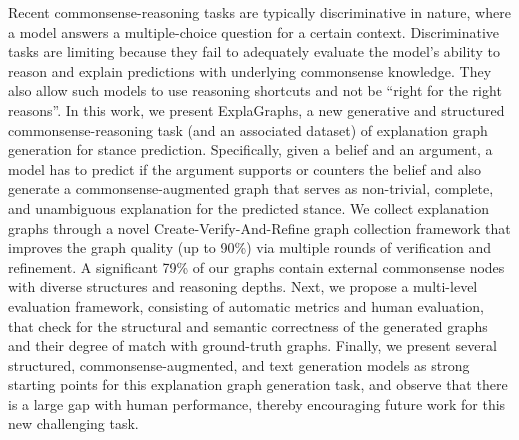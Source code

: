 Recent commonsense-reasoning tasks are typically discriminative in nature, where a model answers a multiple-choice question for a certain context. Discriminative tasks are limiting because they fail to adequately evaluate the model's ability to reason and explain predictions with underlying commonsense knowledge. They also allow such models to use reasoning shortcuts and not be ``right for the right reasons''. In this work, we present ExplaGraphs, a new generative and structured commonsense-reasoning task (and an associated dataset) of explanation graph generation for stance prediction. Specifically, given a belief and an argument, a model has to predict if the argument supports or counters the belief and also generate a commonsense-augmented graph that serves as non-trivial, complete, and unambiguous explanation for the predicted stance.  We collect explanation graphs through a novel Create-Verify-And-Refine graph collection framework that improves the graph quality (up to 90\%) via multiple rounds of verification and refinement. A significant 79\% of our graphs contain external commonsense nodes with diverse structures and reasoning depths. Next, we propose a multi-level evaluation framework, consisting of automatic metrics and human evaluation, that check for the structural and semantic correctness of the generated graphs and their degree of match with ground-truth graphs. Finally, we present several structured, commonsense-augmented, and text generation models as strong starting points for this explanation graph generation task, and observe that there is a large gap with human performance, thereby encouraging future work for this new challenging task.

